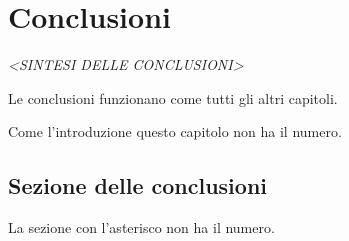 \chapter*{Conclusioni}

\vspace{2cm}

\begin{flushright}
 \textit{<SINTESI DELLE CONCLUSIONI>}
\end{flushright}

\vspace{0.5cm}

Le conclusioni funzionano come tutti gli altri capitoli.

Come l'introduzione questo capitolo non ha il numero.

\section*{Sezione delle conclusioni}
La sezione con l'asterisco non ha il numero.
